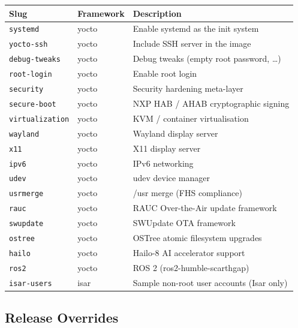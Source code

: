 \documentclass[a4paper,11pt]{article}
\begin{document}
\begin{tabularx}{\linewidth}{L{34mm}L{22mm}X}
  \textbf{Slug} & \textbf{Framework} & \textbf{Description} \\
  \toprule
   \texttt{systemd}      & yocto & Enable systemd as the init system \\
    \texttt{yocto-ssh}   & yocto & Include SSH server in the image \\
   \texttt{debug-tweaks}& yocto & Debug tweaks (empty root password, \ldots) \\
    \texttt{root-login}  & yocto & Enable root login \\
   \texttt{security}    & yocto & Security hardening meta-layer \\
    \texttt{secure-boot} & yocto & NXP HAB / AHAB cryptographic signing \\
   \texttt{virtualization}& yocto& KVM / container virtualisation \\
    \texttt{wayland}     & yocto & Wayland display server \\
   \texttt{x11}         & yocto & X11 display server \\
    \texttt{ipv6}        & yocto & IPv6 networking \\
   \texttt{udev}        & yocto & udev device manager \\
    \texttt{usrmerge}    & yocto & /usr merge (FHS compliance) \\
   \texttt{rauc}        & yocto & RAUC Over-the-Air update framework \\
    \texttt{swupdate}    & yocto & SWUpdate OTA framework \\
   \texttt{ostree}      & yocto & OSTree atomic filesystem upgrades \\
    \texttt{hailo}       & yocto & Hailo-8 AI accelerator support \\
   \texttt{ros2}        & yocto & ROS 2 (ros2-humble-scarthgap) \\
    \texttt{isar-users}  & isar  & Sample non-root user accounts (Isar only) \\
  \bottomrule
\end{tabularx}

\subsection{Release Overrides}
\end{document}
